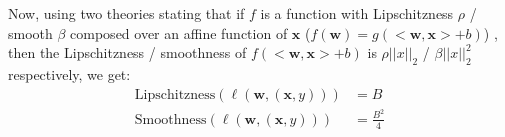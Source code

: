 Now, using two theories stating that if $f$ is a function with Lipschitzness $\rho$ / smooth $\beta$ composed over an affine function of $\pmb{x}$ ($f(\pmb{w}) = g(<\pmb{w}, \pmb{x}> + b)$) , then the Lipschitzness / smoothness of $f(<\pmb{w}, \pmb{x}> + b)$ is $\rho ||x||_2$ / $\beta ||x||^2_2$ respectively, we get:
\begin{equation*}
    \begin{split}
        \text{Lipschitzness}(\ell(\pmb{w},(\pmb{x}, y))) &= B \\
        \text{Smoothness}(\ell(\pmb{w},(\pmb{x}, y))) &= \frac{B^2}{4} \\
    \end{split}
\end{equation*}
